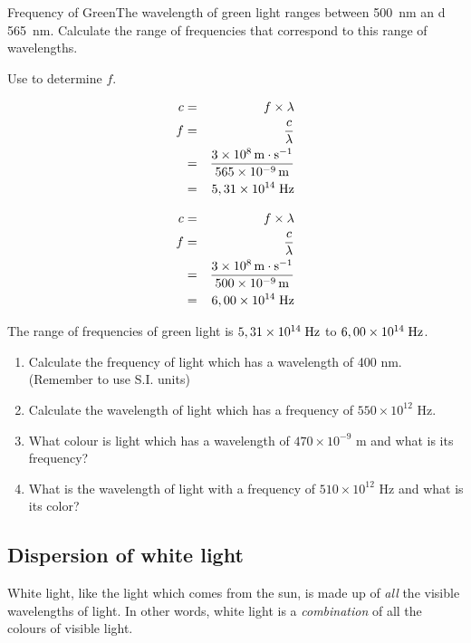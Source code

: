 \begin{wex}
{Frequency of Green}{The wavelength of green light ranges between 500~nm an d 565~nm. Calculate the range of frequencies that correspond to this range of wavelengths.}{
Use 
to determine $f$.

\begin{eqnarray*}
c &=& f \times \lambda\\
f&=&\frac{c}{\lambda}\\
&=&\frac{3 \times 10^8 \,\mathrm{m \cdot s^{-1}}}{565 \times 10^{-9}\,\rm{m}}\\
&=&5,31 \times 10^{14}\;\rm{Hz}
\end{eqnarray*}

\begin{eqnarray*}
c &=& f \times \lambda\\
f&=&\frac{c}{\lambda}\\
&=&\frac{3 \times 10^8 \,\mathrm{m \cdot s^{-1}}}{500 \times 10^{-9}\,\rm{m}}\\
&=&6,00 \times 10^{14}\;\rm{Hz}
\end{eqnarray*}

The range of frequencies of green light is $5,31 \times 10^{14}\;\rm{Hz}$ to $6,00 \times 10^{14}\;\rm{Hz}$.
}
\end{wex}

{
\begin{enumerate}
\item Calculate the frequency of light which has a wavelength of 400 nm. (Remember to use S.I. units)
\item Calculate the wavelength of light which has a frequency of $550\times 10^{12}$ Hz.
\item What colour is light which has a wavelength of $470\times 10^{-9}$ m and what is its frequency?
\item What is the wavelength of light with a frequency of $510 \times 10^{12}$ Hz and what is its color?
\end{enumerate}
}

\subsection{Dispersion of white light}

White light, like the light which comes from the sun, is made up of \textit{all} the visible wavelengths of light. In other words, white light is a \textit{combination} of all the colours of visible light. 

